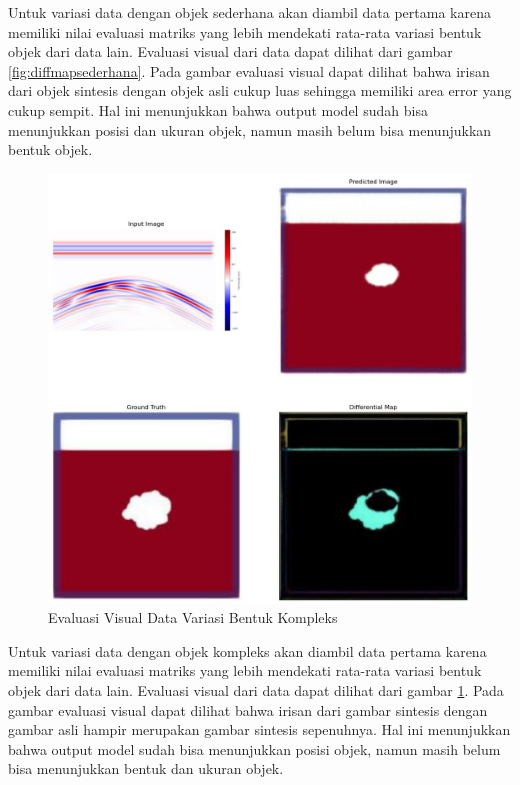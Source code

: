 Untuk variasi data dengan objek sederhana akan diambil data pertama karena memiliki nilai evaluasi matriks yang lebih mendekati rata-rata variasi bentuk objek dari data lain. 
Evaluasi visual dari data dapat dilihat dari gambar \ref{fig:diffmapsederhana}.
Pada gambar evaluasi visual dapat dilihat bahwa irisan dari objek sintesis dengan objek asli cukup luas sehingga memiliki area error yang cukup sempit. 
Hal ini menunjukkan bahwa output model sudah bisa menunjukkan posisi dan ukuran objek, namun masih belum bisa menunjukkan bentuk objek.

\begin{figure}[ht]
  \centering
  \includegraphics[scale=0.16]{gambar/diffMapKompleks.jpg}
  \caption{Evaluasi Visual Data Variasi Bentuk Kompleks}
  \label{fig:diffmapkompleks}
\end{figure}
\newpage
Untuk variasi data dengan objek kompleks akan diambil data pertama karena memiliki nilai evaluasi matriks yang lebih mendekati rata-rata variasi bentuk objek dari data lain. 
Evaluasi visual dari data dapat dilihat dari gambar \ref{fig:diffmapkompleks}. 
Pada gambar evaluasi visual dapat dilihat bahwa irisan dari gambar sintesis dengan gambar asli hampir merupakan gambar sintesis sepenuhnya. 
Hal ini menunjukkan bahwa output model sudah bisa menunjukkan posisi objek, namun masih belum bisa menunjukkan bentuk dan ukuran objek.

